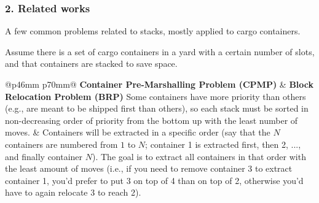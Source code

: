 \documentclass{beamer}
\def\\{}
\begin{document}
\begin{frame}
\frametitle{2. Related works}

A few common problems related to stacks, mostly applied to cargo containers.

Assume there is a set of cargo containers in a yard with a certain number of slots, and that containers are stacked to save space.

\vspace{0.5em}

\begin{tabular}{@{}p{46mm} p{70mm}@{}}
  \textbf{Container Pre-Marshalling Problem (CPMP)} & \textbf{Block Relocation Problem (BRP)} \\
  Some containers have more priority than others (e.g., are meant to be shipped first than others), so each stack must be sorted in non-decreasing order of priority from the bottom up with the least number of moves. &
  Containers will be extracted in a specific order (say that the $N$ containers are numbered from $1$ to $N$; container 1 is extracted first, then 2, ..., and finally container $N$). The goal is to extract all containers in that order with the least amount of moves (i.e., if you need to remove container 3 to extract container 1, you'd prefer to put 3 on top of 4 than on top of 2, otherwise you'd have to again relocate 3 to reach 2).
\end{tabular}

\end{frame}



\end{document}
